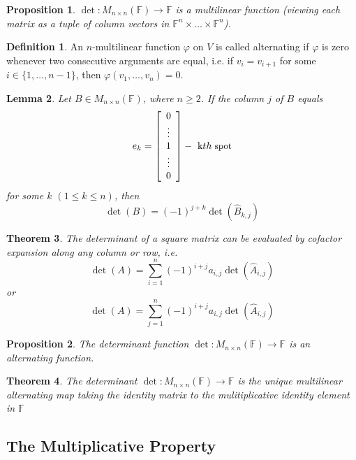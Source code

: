 \documentclass[12pt,letterpaper]{article}
\theoremstyle{plain}
\newtheorem{theorem}{Theorem}[section]
\newtheorem{proposition}{Proposition}[section]
\newtheorem{lemma}[theorem]{Lemma}
\theoremstyle{definition}
\newtheorem{definition}[theorem]{Definition}
\numberwithin{equation}{section}
\begin{document}
\begin{proposition}$\det:M_{n\times n}(\mathbb{F})\rightarrow \mathbb{F}$ is a multilinear function (viewing each matrix as a tuple of column vectors in $\mathbb{F}^n\times \ldots \times \mathbb{F}^n$).
\end{proposition}

\begin{definition}An $n$-multilinear function $\varphi$ on $V$ is called alternating if $\varphi$ is zero whenever two consecutive arguments are equal, i.e. if $v_i=v_{i+1}$ for some $i\in\{1,\ldots, n-1\}$, then $\varphi(v_1, \ldots ,v_n)=0$. 
\end{definition}


\begin{lemma}Let $B\in M_{n\times n}(\mathbb{F})$, where $n\geq 2$. If the column $j$ of $B$ equals 
\[e_k=\left[\begin{array}{c}0\\\vdots\\ 1\\\vdots\\ 0\end{array}\right] - \text{ k}\small{th} \text{ spot}\] for some $k$ $(1\leq k\leq n)$, then 
\[\det(B)=(-1)^{j+k}\det(\hat{B}_{k,j})\]
\end{lemma}

\begin{theorem} The determinant of a square matrix can be evaluated by cofactor expansion along any column or row, i.e. 
\[\det(A)=\sum_{i=1}^n (-1)^{i+j}a_{i,j} \det(\hat{A}_{i,j})\]
or 
\[\det(A)=\sum_{j=1}^n (-1)^{i+j}a_{i,j} \det(\hat{A}_{i,j})\]
\end{theorem}


\begin{proposition}
The determinant function $\det:M_{n\times n}(\mathbb{F})\rightarrow \mathbb{F}$ is an alternating function.
\end{proposition}

\begin{theorem}\label{unique}
The determinant $\det:M_{n\times n}(\mathbb{F})\rightarrow \mathbb{F}$ is the \emph{unique} multilinear alternating map taking the identity matrix to the mulitiplicative identity element in $\mathbb{F}$
\end{theorem}


\subsection{The Multiplicative Property}
\end{document}
